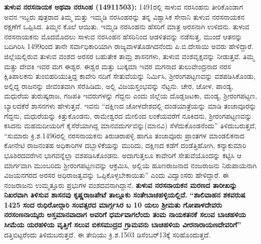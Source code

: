 \textbf{ತುಳುವ ನರಸನಾಯಕ ಅಥವಾ ನರಸಿಂಹ (1491\general{\enginline{-}}1503): } 1491ರಲ್ಲಿ ಸಾಳುವ ನರಸಿಂಹನು ತೀರಿಕೊಂಡಾಗ ಅವನ ಇಬ್ಬರು ಪುತ್ರರಾದ ತಿಮ್ಮ ಮತ್ತು ಇಮ್ಮಡಿ ನರಸಿಂಹರನ್ನು ತನ್ನ ವಿಶ್ವಾಸಿಕ ಸೇನಾನಿ ತುಳುವ ನರಸನಾಯಕನ ರಕ್ಷಣೆಗೆ ಒಪ್ಪಿಸಿದ. ತಿಮ್ಮನ ಕೊಲೆ ಆಯಿತು. ಇಮ್ಮಡಿ ನರಸಿಂಹನು ಹೆಸರಿಗೆ ಮಾತ್ರ ಅರಸನಾಗಿ ಉಳಿದನು. ತುಳುವ ನರಸನಾಯಕನು ಮೊದಮೊದಲು ಸಾಳುವ ನರಸಿಂಹನ ಹೆಸರಿನಿಂದ ಆಡಳಿತವನ್ನು ನಡೆಸುತ್ತ, ಮುಂದೆ ಆತನನ್ನು ಬದಿಗಿರಿಸಿ 1499ರಿಂದ ತಾನೇ ಸರ್ವಾಧಿಕಾರಿಯಾಗಿ ರಾಜ್ಯವಾಳತೊಡಗಿದನೆಂದು ಪಿ.ಬಿ.ದೇಸಾಯಿ ಅವರು ಹೇಳಿದ್ದಾರೆ. ಜಿಲ್ಲೆಯಲ್ಲಿರುವ ತುಳುವ ವಂಶದ ಅರಸರ ಬಹುತೇಕ ತಾಮ್ರ ಶಾಸನಗಳು, ತುಳುವ ವಂಶವೃಕ್ಷವನ್ನು ನೀಡುತ್ತವೆ. ತಿಮ್ಮ ಮತ್ತು ದೇವಕಿ ಇವರ ಮಗ ಈಶ್ವರ. ಈಶ್ವರ ಮತ್ತು ಬುಕ್ಕಮಾ ಇವರ ಮಗನಾದ ತುಲುವೇಂದ್ರನಾದ ನರಸ ಕ್ಷಿತಿಪಾಲಕನು ತುಂಬಿಹರಿಯುತ್ತಿದ್ದ ಕಾವೇರಿ ನದಿಗೆ ಸೇತುವೆಯನ್ನು ನಿರ್ಮಿಸಿ, ಶ‍್ರೀರಂಗಪಟ್ಟಣವನ್ನು ವಶಪಡಿಸಿಕೊಂಡು, ಅಲ್ಲಿದ್ದ ರಾಜನನ್ನು ಜೀವಂತವಾಗಿ ಸೆರೆಹಿಡಿದು, ಅಲ್ಲಿ ವಿಜಯಸ್ತಂಭವನ್ನು ನೆಟ್ಟನು. ಚೇರ, ಚೋಳ, ಪಾಂಡ್ಯ, ಮಧುರೆಯ ತುರುಷ್ಕರಾಜ, ಗಜಪತಿ ಇವರುಗಳನ್ನು ಗೆದ್ದನು ಎಂದು ಜಿಲ್ಲೆಯ ದೊಡ್ಡಜಟಕಾ, ಮಂಡ್ಯ, ಶ‍್ರೀರಂಗಪಟ್ಟಣ, ಬ್ಯಾಲದಕೆರೆ ಶಾಸನಗಳು ಹೇಳುತ್ತವೆ. ಇವನು “ದಕ್ಷಿಣದ ಚೋಳದೇಶದಲ್ಲಿ ದಂಡಯಾತ್ರೆಯನ್ನು ಮಾಡಿ ತಂಜಾವೂರನ್ನು ಗೆದ್ದನು, ಮಧುರೆಯನ್ನು ಕಿತ್ತುಕೊಂಡನು, ರಾಮೇಶ್ವರದ ಮೇಲಿಂದ ಲಂಕೆಯವರೆಗೆ ನೂಕಿದನು, ಶ‍್ರೀರಂಗಪಟ್ಟಣವನ್ನು ಕಸಿದನು ಮಹಮದೀಯರಿಗೆ ಕೈಸೆರೆಯಾಗಿದ್ದ ಮಾನವದುರ್ಗವನ್ನು(ಮಾನವಿ) ಸೆಳೆದುಕೊಂಡನೆಂದು” ತಿಳಿದುಬರುತ್ತದೆ, “ಸುಮಾರು ಕ್ರಿ.ಶ.1496ರಲ್ಲಿ ನರಸನಾಯಕನು ತಿರುಚಿರಾಪಳ್ಳಿ ಹಾಗೂ ತಂಜಾವೂರು ಪ್ರಾಂತಗಳ ಮಾಂಡಲಿಕನಾದ ಕೋನೇಟಿ ರಾಜನಂತಹ ಅಧಿಕಾರಿಗಳ ದಬ್ಬಾಳಿಕೆಯನ್ನು ಮುರಿದು, ದಕ್ಷಿಣದ ಕಡೆಗೆ ದಂಡೆತ್ತಿಹೋಗಿ, ಕನ್ಯಾಕುಮಾರಿ ಭೂಶಿರದವರೆಗಿನ ಭಾಗವನ್ನೆಲ್ಲಾ ವಶಪಡಿಸಿಕೊಂಡನು. ಅದಾಗುತ್ತಲೂ ಕಾವೇರಿಗೆ ಸೇತುವೆಯೊಂದನ್ನು ಕಟ್ಟಿಸಿ ಆ ಮಾರ್ಗವಾಗಿ ಮುಂಬರಿದು ಶ‍್ರೀರಂಗಪಟ್ಟಣ\-ವನ್ನು ಆಕ್ರಮಿಸಿ, ಅಲ್ಲಿಯ ಹೂಣರಾಜನಾದ ನಂಜರಾಜನು ನಿರುಪಾಯನಾಗಿ ವಿಜಯನಗರದ ಅರಸರ ಅಧಿರಾಜತ್ವವನ್ನು ಒಪ್ಪಿಕೊಳ್ಳ\-ಬೇಕಾಯಿತು” ಎಂದು ವಿದ್ವಾಂಸರು ಹೇಳಿದ್ದಾರೆ. ಈ ನಂಜರಾಜನು ಉಮ್ಮತ್ತೂರು ಪ್ರಭುಗಳ ವಂಶದವನಾಗಿದ್ದಾನೆ. \textbf{ತುಳುವ ನರಸನಾಯಕನ ಮರಣದ ತಾರೀಖನ್ನು ನಿಖರವಾಗಿ ತಿಳಿಸುವ ಶಾಸನವು ಕೃಷ್ಣರಾಜಪೇಟೆ ತಾಲ್ಲೂಕು ಸಂತೇಬಾಚಹಳ್ಳಿ\-ಯಲ್ಲಿದೆ.} \textbf{“ಶಾಲಿವಾಹನ ಶಕವರುಷ 1425 ಸಂದ ರುಧಿರೋದ್ಗಾರಿ ಸಂವತ್ಸರದ ಮಾರ್ಗ್ಗಸಿರ ಬ 10 ಯಲು ಶ‍್ರೀಮತು ಗೋಪಾಳದೇವರು ನರಸಂಣನಾಯ್ಕರು ಅಸ್ತಮಾನವಾದಾಗ ಅವರಿಗೆ ಧರ್ಮವಾಗಲೆಂದು ತಂಮ ನಾಯಕತನಕೆ ಸಲುವ ಬಾಚಹಳಿಯ ಸೀಮೆಯ ಯರಹಳಿಯ ವೃತ್ತಿಗೆ ಸಲುವ ಬಿಕಸಮುದ್ರದ ಗ್ರಾಮವನು ಬಾಚಿಹಳಿಯ ವೀರನಾರಾಯಣದೇವರಿಗೆ”} ದತ್ತಿಬಿಟ್ಟರೆಂದು ತಿಳಿದುಬರುತ್ತದೆ. ಈ ತೇದಿಯು ಕ್ರಿ.ಶ.1503 ಡಿಸೆಂಬರ್​ 13ಕ್ಕೆ ಸರಿಹೊಂದುತ್ತದೆ.

